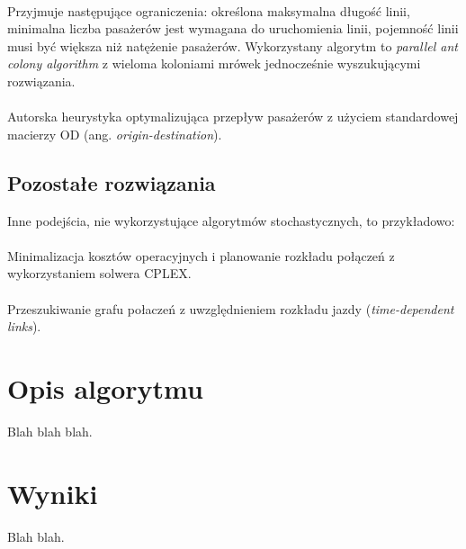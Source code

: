 \documentclass[a4paper]{article}
\begin{document}
\paragraph{\cite{bib-ant-colony}}
Przyjmuje następujące ograniczenia: określona maksymalna długość linii, minimalna liczba pasażerów jest wymagana do uruchomienia linii, pojemność linii musi być większa niż natężenie pasażerów. Wykorzystany algorytm to \textit{parallel ant colony algorithm} z wieloma koloniami mrówek jednocześnie wyszukującymi rozwiązania.

\paragraph{\cite{bib-transit-oriented}}
Autorska heurystyka optymalizująca przepływ pasażerów z użyciem standardowej macierzy OD (ang. \textit{origin-destination}).

\subsection{Pozostałe rozwiązania}
Inne podejścia, nie wykorzystujące algorytmów stochastycznych, to przykładowo:

\paragraph{\cite{bib-route-optimization}}
Minimalizacja kosztów operacyjnych i planowanie rozkładu połączeń z wykorzystaniem solwera CPLEX.

\paragraph{\cite{bib-theoretical-framework}}
Przeszukiwanie grafu połaczeń z uwzględnieniem rozkładu jazdy (\textit{time-dependent links}).

\newpage




\section{Opis algorytmu} \label{sec:solution}
Blah blah blah.

\newpage


\section{Wyniki}
Blah blah.

\newpage

\nocite{bib-transit-oriented}


\newpage

\listoffigures
\newpage
\end{document}
